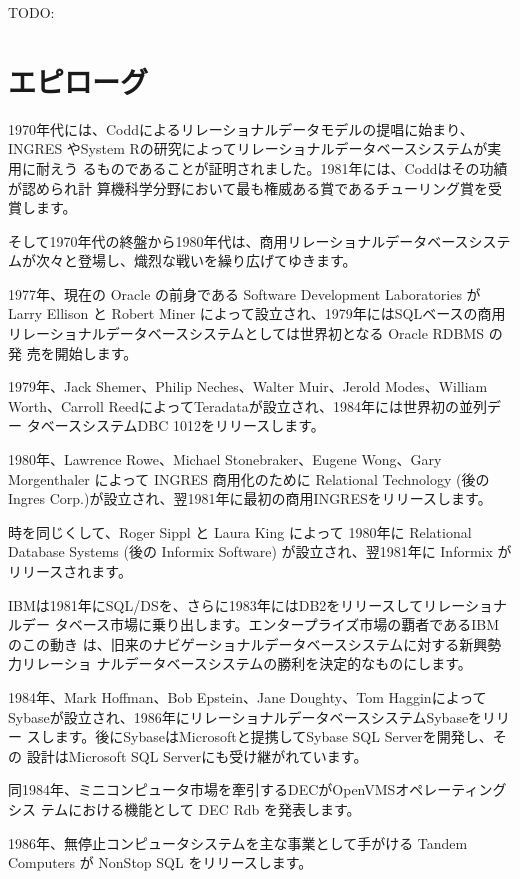 TODO:

\section{エピローグ}

1970年代には、Coddによるリレーショナルデータモデルの提唱に始まり、INGRES
やSystem Rの研究によってリレーショナルデータベースシステムが実用に耐えう
るものであることが証明されました。1981年には、Coddはその功績が認められ計
算機科学分野において最も権威ある賞であるチューリング賞を受賞します。

そして1970年代の終盤から1980年代は、商用リレーショナルデータベースシステ
ムが次々と登場し、熾烈な戦いを繰り広げてゆきます。

1977年、現在の Oracle の前身である Software Development Laboratories が
Larry Ellison と Robert Miner によって設立され、1979年にはSQLベースの商用
リレーショナルデータベースシステムとしては世界初となる Oracle RDBMS の発
売を開始します。

1979年、Jack Shemer、Philip Neches、Walter Muir、Jerold Modes、William
Worth、Carroll ReedによってTeradataが設立され、1984年には世界初の並列デー
タベースシステムDBC 1012をリリースします。

1980年、Lawrence Rowe、Michael Stonebraker、Eugene Wong、Gary
Morgenthaler によって INGRES 商用化のために Relational Technology (後の
Ingres Corp.)が設立され、翌1981年に最初の商用INGRESをリリースします。

時を同じくして、Roger Sippl と Laura King によって 1980年に Relational
Database Systems (後の Informix Software) が設立され、翌1981年に
Informix がリリースされます。

IBMは1981年にSQL/DSを、さらに1983年にはDB2をリリースしてリレーショナルデー
タベース市場に乗り出します。エンタープライズ市場の覇者であるIBMのこの動き
は、旧来のナビゲーショナルデータベースシステムに対する新興勢力リレーショ
ナルデータベースシステムの勝利を決定的なものにします。

1984年、Mark Hoffman、Bob Epstein、Jane Doughty、Tom Hagginによって
Sybaseが設立され、1986年にリレーショナルデータベースシステムSybaseをリリー
スします。後にSybaseはMicrosoftと提携してSybase SQL Serverを開発し、その
設計はMicrosoft SQL Serverにも受け継がれています。

同1984年、ミニコンピュータ市場を牽引するDECがOpenVMSオペレーティングシス
テムにおける機能として DEC Rdb を発表します。

1986年、無停止コンピュータシステムを主な事業として手がける Tandem
Computers が NonStop SQL をリリースします。

